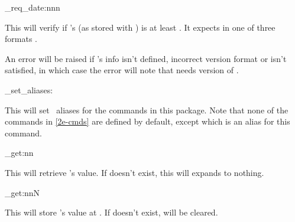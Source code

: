 \documentclass[10pt]{article}
\begin{document}
\begin{codedescribe}{\pkginfograb_req_date:nnn}
\begin{codesyntax}%
\end{codesyntax}
This will verify if 's  (as stored with ) is at least . It expects  in one of three formats  .
\end{codedescribe}
\begin{tsremark}
  An error will be raised if 's info isn't defined, incorrect version format or  isn't satisfied, in which case the error will note that  needs version  of .
\end{tsremark}


\begin{codedescribe}{\pkginfograb_set_aliases:}
\begin{codesyntax}%
\end{codesyntax}
This will set \LaTeXe\  aliases for the  commands in this package. Note that none of the commands in \ref{2e-cmds} are defined by default, except \tsobj{\PkgInfoSetAliases} which is an alias for this command.
\end{codedescribe}



\begin{codedescribe}{\pkginfograb_get:nn}
\begin{codesyntax}%
\end{codesyntax}
This will retrieve 's value. If  doesn't exist, this will expands to nothing.
\end{codedescribe}

\begin{codedescribe}{\pkginfograb_get:nnN}
\begin{codesyntax}%
\end{codesyntax}
This will store 's value at . If  doesn't exist,  will be cleared.
\end{codedescribe}
\end{document}
